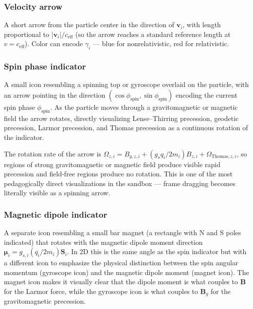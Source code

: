\documentclass[11pt,a4paper]{article}
\newcommand{\vv}[1]{\mathbf{#1}}
\begin{document}
\subsubsection*{Velocity arrow}

A short arrow from the particle center in the direction of $\vv{v}_i$, with length proportional to $|\vv{v}_i|/c_{\mathrm{eff}}$ (so the arrow reaches a standard reference length at $v = c_{\mathrm{eff}}$).  Color can encode $\gamma_i$ --- blue for nonrelativistic, red for relativistic.

\subsubsection*{Spin phase indicator}

A small icon resembling a spinning top or gyroscope overlaid on the particle, with an arrow pointing in the direction $(\cos\phi_{\mathrm{spin}}, \sin\phi_{\mathrm{spin}})$ encoding the current spin phase $\phi_{\mathrm{spin}}$.  As the particle moves through a gravitomagnetic or magnetic field the arrow rotates, directly visualizing Lense--Thirring precession, geodetic precession, Larmor precession, and Thomas precession as a continuous rotation of the indicator.

The rotation rate of the arrow is $\Omega_{z,i} = B_{g,z,i} + (g_s q_i/2m_i)B_{z,i} + \Omega_{\mathrm{Thomas},z,i}$, so regions of strong gravitomagnetic or magnetic field produce visible rapid precession and field-free regions produce no rotation.  This is one of the most pedagogically direct visualizations in the sandbox --- frame dragging becomes literally visible as a spinning arrow.

\subsubsection*{Magnetic dipole indicator}

A separate icon resembling a small bar magnet (a rectangle with N and S poles indicated) that rotates with the magnetic dipole moment direction $\boldsymbol{\mu}_i = g_{s,i}(q_i/2m_i)\vv{S}_i$.  In 2D this is the same angle as the spin indicator but with a different icon to emphasize the physical distinction between the spin angular momentum (gyroscope icon) and the magnetic dipole moment (magnet icon).  The magnet icon makes it visually clear that the dipole moment is what couples to $\vv{B}$ for the Larmor force, while the gyroscope icon is what couples to $\vv{B}_g$ for the gravitomagnetic precession.
\end{document}
